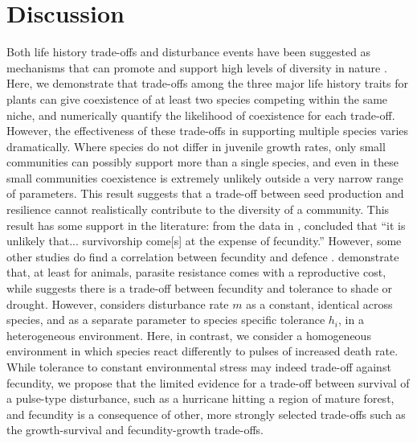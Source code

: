 \section{Discussion}
Both life history trade-offs and disturbance events have been suggested as mechanisms that can promote and support high levels of diversity in nature \citep[e.g.][]{adler2000space,denslow1987tropical,sousa1984role,turnbull1999seed}. Here, we demonstrate that trade-offs among the three major life history traits for plants can give coexistence of at least two species competing within the same niche, and numerically quantify the likelihood of coexistence for each trade-off. However, the effectiveness of these trade-offs in supporting multiple species varies dramatically. Where species do not differ in juvenile growth rates, only small communities can possibly support more than a single species, and even in these small communities coexistence is extremely unlikely outside a very narrow range of parameters. This result suggests that a trade-off between seed production and resilience cannot realistically contribute to the diversity of a community. This result has some support in the literature: from the data in \cite{martin2010dispersal}, \cite{martin2010divergence} concluded that ``it is unlikely that... survivorship come[s] at the expense of fecundity.'' However, some other studies do find a correlation between fecundity and defence \citep[e.g.][]{marquis1984leaf,gwynn2005resistance}. \cite{gwynn2005resistance} demonstrate that, at least for animals, parasite resistance comes with a reproductive cost, while \cite{muller2010tolerance} suggests there is a trade-off between fecundity and tolerance to shade or drought. However, \cite{muller2010tolerance} considers disturbance rate $m$ as a constant, identical across species, and as a separate parameter to species specific tolerance $h_i$, in a heterogeneous environment. Here, in contrast, we consider a homogeneous environment in which species react differently to pulses of increased death rate. While tolerance to constant environmental stress may indeed trade-off against fecundity, we propose that the limited evidence for a trade-off between survival of a pulse-type disturbance, such as a hurricane hitting a region of mature forest, and fecundity is a consequence of other, more strongly selected trade-offs such as the growth-survival and fecundity-growth trade-offs. 


